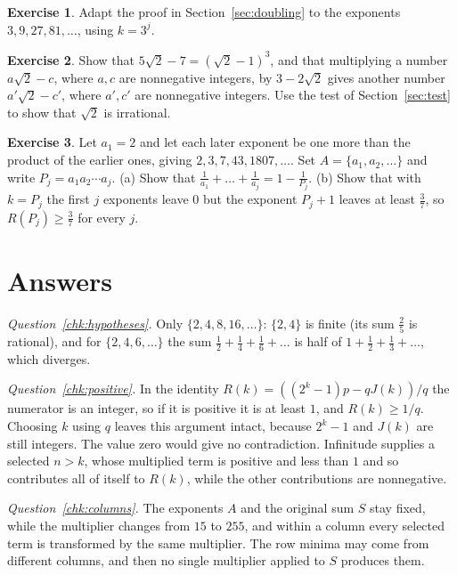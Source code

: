 \documentclass[10pt]{article}
\theoremstyle{plain}
\theoremstyle{definition}
\newtheorem{exercise}{Exercise}
\theoremstyle{remark}
\begin{document}
\begin{exercise}\label{ex:4}
Adapt the proof in Section~\ref{sec:doubling} to the exponents
$3,9,27,81,\dots$, using $k=3^j$.
\end{exercise}

\begin{exercise}\label{ex:5}
Show that $5\sqrt2-7=(\sqrt2-1)^3$, and that multiplying a number
$a\sqrt2-c$, where $a,c$ are nonnegative integers, by $3-2\sqrt2$ gives
another number $a'\sqrt2-c'$, where $a',c'$ are nonnegative integers. Use the test of
Section~\ref{sec:test} to show that $\sqrt2$ is irrational.
\end{exercise}

\begin{exercise}\label{ex:6}
Let $a_1=2$ and let each later exponent be one more than the product of the
earlier ones, giving $2,3,7,43,1807,\dots$. Set $A=\{a_1,a_2,\dots\}$
and write $P_j=a_1a_2\cdots a_j$.
(a) Show that $\tfrac1{a_1}+\dots+\tfrac1{a_j}=1-\tfrac1{P_j}$. (b) Show that
with $k=P_j$ the first $j$ exponents leave $0$ but the exponent $P_j+1$ leaves at
least $\tfrac37$, so $R(P_j)\ge\tfrac37$ for every $j$.
\end{exercise}

\section{Answers}\label{app:answers}
\begingroup
\setlength{\parskip}{0.7ex plus 0.2ex}
\setlength{\parindent}{0pt}

\emph{Question~\ref{chk:hypotheses}.} Only $\{2,4,8,16,\dots\}$: $\{2,4\}$ is
finite (its sum $\tfrac25$ is rational), and for $\{2,4,6,\dots\}$ the sum
$\tfrac12+\tfrac14+\tfrac16+\dots$ is half of $1+\tfrac12+\tfrac13+\dots$,
which diverges.

\emph{Question~\ref{chk:positive}.} In the identity
$R(k)=((2^k-1)p-qJ(k))/q$ the numerator is an integer, so if it is
positive it is at least $1$, and $R(k)\ge1/q$. Choosing $k$ using $q$
leaves this argument intact, because $2^k-1$ and $J(k)$ are still
integers. The value zero would give no contradiction. Infinitude
supplies a selected $n>k$, whose multiplied term is positive and less
than $1$ and so contributes all of itself to $R(k)$, while the other
contributions are nonnegative.

\emph{Question~\ref{chk:columns}.} The exponents $A$ and the original
sum $S$ stay fixed, while the multiplier changes from $15$ to $255$, and
within a column every selected term is transformed by the same
multiplier. The row minima may come from different columns, and then no
single multiplier applied to $S$ produces them.
\end{document}
